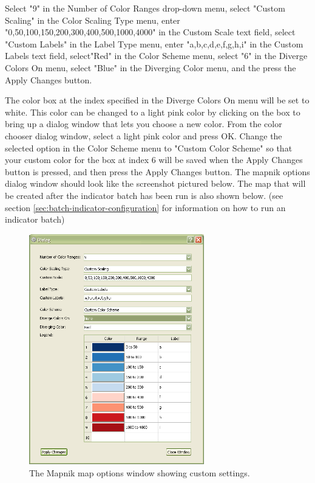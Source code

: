 Select "9" in the Number of Color Ranges drop-down menu, select 
"Custom Scaling" in the Color Scaling Type menu, enter 
"0,50,100,150,200,300,400,500,1000,4000" in the Custom Scale text field, 
select "Custom Labels" in the Label Type menu, enter "a,b,c,d,e,f,g,h,i" 
in the Custom Labels text field, select"Red" in the Color Scheme menu, 
select "6" in the Diverge Colors On menu, select "Blue" in the Diverging 
Color menu, and the press the Apply Changes button.

The color box at the index specified in the Diverge Colors On menu 
will be set to white. This color can be changed to a light pink 
color by clicking on the box to bring up a dialog window that lets 
you choose a new color. From the color chooser dialog window, select 
a light pink color and press OK.  Change the selected option in the 
Color Scheme menu to "Custom Color Scheme" so that your custom color 
for the box at index 6 will be saved when the Apply Changes button 
is pressed, and then press the Apply Changes button. The mapnik 
options dialog window should look like the screenshot pictured below. 
The map that will be created after the indicator batch has been run 
is also shown below. (see section \ref{sec:batch-indicator-configuration}
for information on how to run an indicator batch)

\begin{figure}[hb]
\begin{center}
\includegraphics[width=3in]{part-gui/images/result-manager-custom-mapnik-settings.png}
\end{center}
\caption{The Mapnik map options window showing custom settings.}
\label{fig:result-manager-custom-mapnik-settings}
\end{figure}
\clearpage

